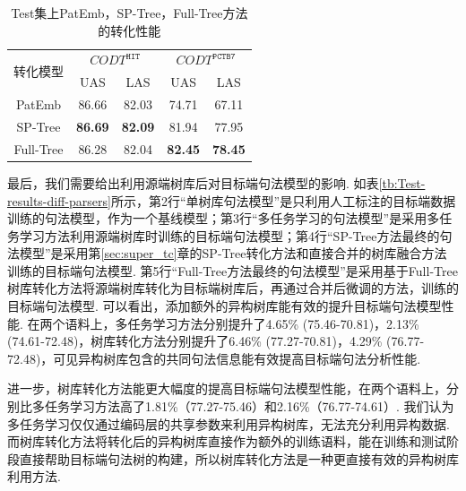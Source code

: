 \begin{table}[hb!]
    \addtolength{\tabcolsep}{+1.0mm}
    \centering
    \caption{Test集上PatEmb，SP-Tree，Full-Tree方法的转化性能}
    \label{tb:Test-results}
    \begin{tabular}{c cc cc}
        \toprule
        \multirow{2}{1.5cm}{转化模型} & \multicolumn{2}{c}{$CODT^{\texttt{HIT}}$} & \multicolumn{2}{c}{$CODT^{\texttt{PCTB7}}$}                       \\
        \cmidrule(lr){2-3}
        \cmidrule(lr){4-5}
                                      & UAS                                       & LAS                                         & UAS      & LAS      \\
        \midrule
        PatEmb                        & 86.66                                     & 82.03                                       & 74.71    & 67.11    \\
        SP-Tree                       & \bf86.69                                  & \bf82.09                                    & 81.94    & 77.95    \\
        Full-Tree                     & 86.28                                     & 82.04                                       & \bf82.45 & \bf78.45 \\
        \bottomrule
    \end{tabular}
\end{table}

最后，我们需要给出利用源端树库后对目标端句法模型的影响. 如表\ref{tb:Test-results-diff-parsers}所示，第2行“单树库句法模型”是只利用人工标注的目标端数据训练的句法模型，作为一个基线模型；第3行“多任务学习的句法模型”是采用多任务学习方法利用源端树库时训练的目标端句法模型；第4行“SP-Tree方法最终的句法模型”是采用第\ref{sec:super_tc}章的SP-Tree转化方法和直接合并的树库融合方法训练的目标端句法模型. 第5行“Full-Tree方法最终的句法模型”是采用基于Full-Tree树库转化方法将源端树库转化为目标端树库后，再通过合并后微调的方法，训练的目标端句法模型. 可以看出，添加额外的异构树库能有效的提升目标端句法模型性能. 在两个语料上，多任务学习方法分别提升了4.65\% (75.46-70.81)，2.13\% (74.61-72.48)，树库转化方法分别提升了6.46\% (77.27-70.81)，4.29\% (76.77-72.48)，可见异构树库包含的共同句法信息能有效提高目标端句法分析性能.

进一步，树库转化方法能更大幅度的提高目标端句法模型性能，在两个语料上，分别比多任务学习方法高了1.81\%（77.27-75.46）和2.16\%（76.77-74.61）. 我们认为多任务学习仅仅通过编码层的共享参数来利用异构树库，无法充分利用异构数据. 而树库转化方法将转化后的异构树库直接作为额外的训练语料，能在训练和测试阶段直接帮助目标端句法树的构建，所以树库转化方法是一种更直接有效的异构树库利用方法.


